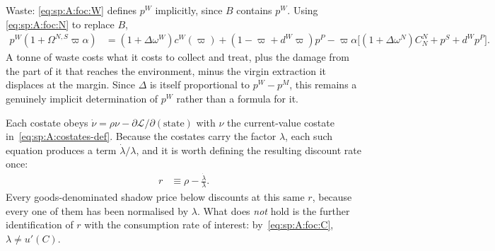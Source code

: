 Waste: \eqref{eq:sp:A:foc:W} defines $p^W$ implicitly, since $B$ contains $p^W$. Using
\eqref{eq:sp:A:foc:N} to replace $B$,
\begin{align}
p^W\left(1+\Omega^{N,S}\varpi\alpha\right)
&= \left(1+\Delta\omega^W\right)c^W\!\left(\varpi\right)+\left(1-\varpi+d^W\varpi\right)p^P
-\varpi\alpha\Big[\left(1+\Delta\omega^N\right)C^N_N+p^S+d^Wp^P\Big].
\label{eq:sp:A:foc:W-solved}
\end{align}
A tonne of waste costs what it costs to collect and treat, plus the damage from the part of it that
reaches the environment, minus the virgin extraction it displaces at the margin. Since $\Delta$ is
itself proportional to $p^W-p^M$, this remains a genuinely implicit determination of $p^W$ rather
than a formula for it.

 Each costate obeys $\dot\nu=\rho\nu-\partial\mathcal L/\partial(\text{state})$
with $\nu$ the current-value costate in~\eqref{eq:sp:A:costates-def}. Because the costates carry the
factor $\lambda$, each such equation produces a term $\dot\lambda/\lambda$, and it is worth defining
the resulting discount rate once:
\begin{align}
r &\equiv \rho-\frac{\dot\lambda}{\lambda}.
\label{eq:sp:A:r}
\end{align}
Every goods-denominated shadow price below discounts at this same $r$, because every one of them has
been normalised by $\lambda$. What does \emph{not} hold is the further identification of $r$ with the
consumption rate of interest: by~\eqref{eq:sp:A:foc:C}, $\lambda\ne u'(C)$.

